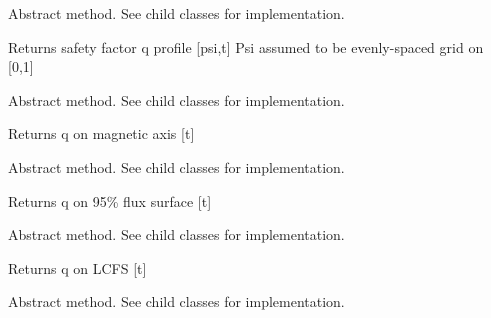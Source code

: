 \documentclass[letterpaper,10pt,english]{sphinxmanual}
\begin{document}
\begin{fulllineitems}
\begin{fulllineitems}
\end{fulllineitems}


\begin{fulllineitems}
\label{eqtools:eqtools.core.Equilibrium.getQProfile}
Abstract method.  See child classes for implementation.

Returns safety factor q profile {[}psi,t{]}
Psi assumed to be evenly-spaced grid on {[}0,1{]}

\end{fulllineitems}


\begin{fulllineitems}
\label{eqtools:eqtools.core.Equilibrium.getQ0}
Abstract method.  See child classes for implementation.

Returns q on magnetic axis {[}t{]}

\end{fulllineitems}


\begin{fulllineitems}
\label{eqtools:eqtools.core.Equilibrium.getQ95}
Abstract method.  See child classes for implementation.

Returns q on 95\% flux surface {[}t{]}

\end{fulllineitems}


\begin{fulllineitems}
\label{eqtools:eqtools.core.Equilibrium.getQLCFS}
Abstract method.  See child classes for implementation.

Returns q on LCFS {[}t{]}

\end{fulllineitems}


\begin{fulllineitems}
\label{eqtools:eqtools.core.Equilibrium.getQ1Surf}
Abstract method.  See child classes for implementation.


\end{fulllineitems}
\end{fulllineitems}
\end{document}
